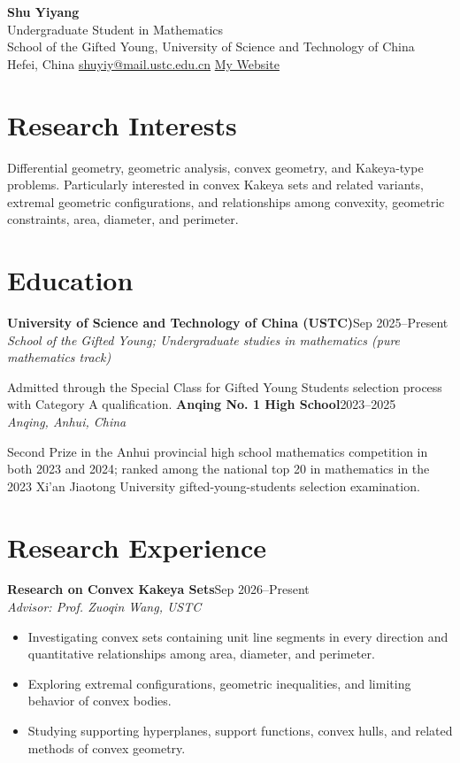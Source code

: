 \documentclass[10pt,a4paper]{article}
\newcommand{\entry}[3]{\textbf{#1}\hfill{\small #2}\\{\emph{#3}}\par}
\begin{document}
\begin{center}
{\LARGE\bfseries Shu Yiyang}\\[4pt]
{\normalsize Undergraduate Student in Mathematics}\\[2pt]
School of the Gifted Young, University of Science and Technology of China\\[2pt]
Hefei, China \quad\textbar\quad \href{mailto:shuyiy@mail.ustc.edu.cn}{shuyiy@mail.ustc.edu.cn} \quad\textbar\quad \href{https://nicholasshu.com}{My Website}
\end{center}
\vspace{-7pt}
\section*{Research Interests}
Differential geometry, geometric analysis, convex geometry, and Kakeya-type problems. Particularly interested in convex Kakeya sets and related variants, extremal geometric configurations, and relationships among convexity, geometric constraints, area, diameter, and perimeter.
\section*{Education}
\entry{University of Science and Technology of China (USTC)}{Sep 2025--Present}{School of the Gifted Young; Undergraduate studies in mathematics (pure mathematics track)}
Admitted through the Special Class for Gifted Young Students selection process with Category A qualification.
\entry{Anqing No. 1 High School}{2023--2025}{Anqing, Anhui, China}
Second Prize in the Anhui provincial high school mathematics competition in both 2023 and 2024; ranked among the national top 20 in mathematics in the 2023 Xi'an Jiaotong University gifted-young-students selection examination.
\section*{Research Experience}
\entry{Research on Convex Kakeya Sets}{Sep 2026--Present}{Advisor: Prof. Zuoqin Wang, USTC}
\begin{itemize}
\item Investigating convex sets containing unit line segments in every direction and quantitative relationships among area, diameter, and perimeter.
\item Exploring extremal configurations, geometric inequalities, and limiting behavior of convex bodies.
\item Studying supporting hyperplanes, support functions, convex hulls, and related methods of convex geometry.
\end{itemize}
\end{document}
